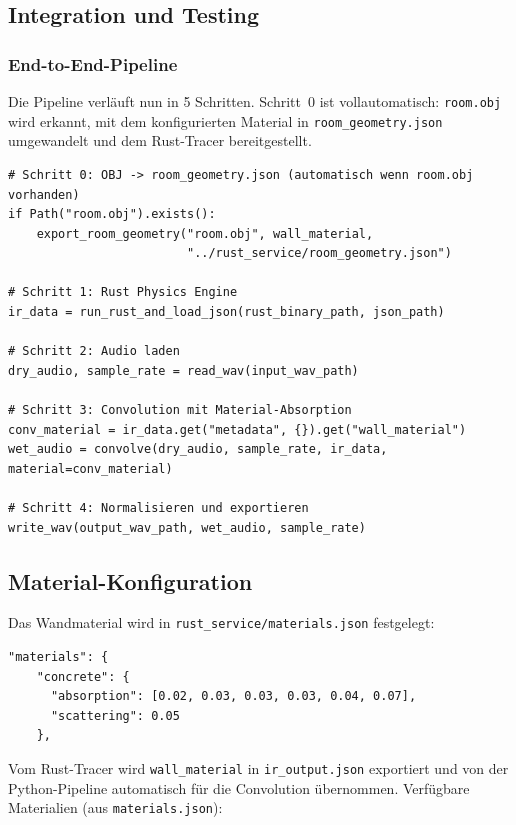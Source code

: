 \subsection{Integration und Testing}

\subsubsection{End-to-End-Pipeline}

Die Pipeline verl\"auft nun in 5 Schritten. Schritt~0 ist vollautomatisch:
\texttt{room.obj} wird erkannt, mit dem konfigurierten Material in
\texttt{room\_geometry.json} umgewandelt und dem Rust-Tracer bereitgestellt.

\begin{lstlisting}
# Schritt 0: OBJ -> room_geometry.json (automatisch wenn room.obj vorhanden)
if Path("room.obj").exists():
    export_room_geometry("room.obj", wall_material,
                         "../rust_service/room_geometry.json")

# Schritt 1: Rust Physics Engine
ir_data = run_rust_and_load_json(rust_binary_path, json_path)

# Schritt 2: Audio laden
dry_audio, sample_rate = read_wav(input_wav_path)

# Schritt 3: Convolution mit Material-Absorption
conv_material = ir_data.get("metadata", {}).get("wall_material")
wet_audio = convolve(dry_audio, sample_rate, ir_data, material=conv_material)

# Schritt 4: Normalisieren und exportieren
write_wav(output_wav_path, wet_audio, sample_rate)
\end{lstlisting}

\subsection{Material-Konfiguration}

Das Wandmaterial wird in \texttt{rust\_service/materials.json} festgelegt:

\begin{lstlisting}[language={}]
"materials": {
    "concrete": {
      "absorption": [0.02, 0.03, 0.03, 0.03, 0.04, 0.07],
      "scattering": 0.05
    },
\end{lstlisting}

Vom Rust-Tracer wird \texttt{wall\_material} in \texttt{ir\_output.json} exportiert
und von der Python-Pipeline automatisch f\"ur die Convolution \"ubernommen.
Verf\"ugbare Materialien (aus \texttt{materials.json}):

